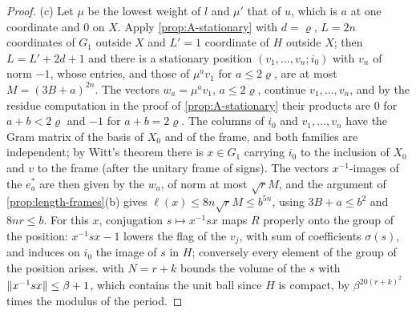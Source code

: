 \begin{proof}
(c) Let $\mu$ be the lowest weight of $l$ and $\mu'$ that of $u$, which is $a$ at one coordinate and $0$ on $X$. Apply \cref{prop:A-stationary} with $d=\varrho$, $L=2n$ coordinates of $G_1$ outside $X$ and $L'=1$ coordinate
of $H$ outside $X$; then $L=L'+2d+1$ and there is a stationary position $(v_1,\dots,v_n;i_0)$ with $v_n$ of norm $-1$, whose entries, and those of $\mu^av_1$ for $a\le2\varrho$, are at most $M=(3B+a)^{2n}$. The vectors
$w_a=\mu^av_1$, $a\le2\varrho$, continue $v_1,\dots,v_n$, and by the residue computation in the proof of \cref{prop:A-stationary} their products are $0$ for $a+b<2\varrho$ and $-1$ for $a+b=2\varrho$. The columns of $i_0$ and
$v_1,\dots,v_n$ have the Gram matrix of the basis of $X_0$ and of the frame, and both families are independent; by Witt's theorem there is $x\in G_1$ carrying $i_0$ to the inclusion of $X_0$ and $v$ to the frame
(after the unitary frame of signs). The vectors $x^{-1}$-images of the $e^*_a$ are then given by the $w_a$, of norm at most $\sqrt rM$, and the argument of \cref{prop:length-frames}(b) gives $\ell(x)\le8n\sqrt rM\le b^{5n}$,
using $3B+a\le b^2$ and $8nr\le b$. For this $x$, conjugation $s\mapsto x^{-1}sx$ maps $R$ properly onto the group of the position: $x^{-1}sx-1$ lowers the flag of the $v_j$, with sum of coefficients
$\sigma(s)$, and induces on $i_0$ the image of $s$ in $H$; conversely every element of the group of the position arises.  with $N=r+k$ bounds the volume of the $s$ with $\lVert x^{-1}sx\rVert\le\beta+1$, which
contains the unit ball since $H$ is compact, by $\beta^{20(r+k)^2}$ times the modulus of the period.
\end{proof}

